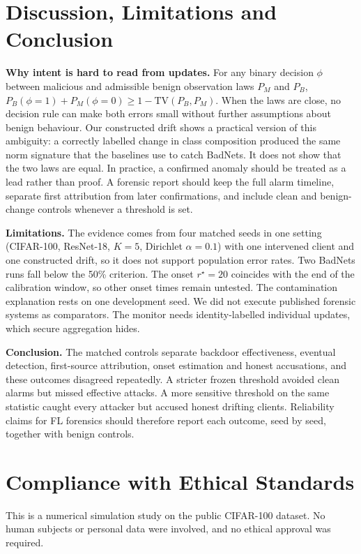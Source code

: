\documentclass{article}
\begin{document}
\section{Discussion, Limitations and Conclusion}
\label{sec:conclusion}

\textbf{Why intent is hard to read from updates.} For any binary decision $\phi$ between malicious and admissible
benign observation laws $P_M$ and $P_B$, $P_B(\phi=1)+P_M(\phi=0)\ge 1-\mathrm{TV}(P_B,P_M)$. When the laws are
close, no decision rule can make both errors small without further assumptions about benign behaviour. Our
constructed drift shows a practical version of this ambiguity: a correctly labelled change in class composition
produced the same norm signature that the baselines use to catch BadNets. It does not show that the two laws are
equal. In practice, a confirmed anomaly should be treated as a lead rather than proof. A forensic report should keep
the full alarm timeline, separate first attribution from later confirmations, and include clean and benign-change
controls whenever a threshold is set.

\textbf{Limitations.} The evidence comes from four matched seeds in one setting (CIFAR-100, ResNet-18, $K=5$,
Dirichlet $\alpha=0.1$) with one intervened client and one constructed drift, so it does not support population
error rates. Two BadNets runs fall below the 50\% criterion. The onset $r^\star=20$ coincides with the end of the
calibration window, so other onset times remain untested. The contamination explanation rests on one development
seed. We did not execute published forensic systems as comparators. The monitor needs identity-labelled individual
updates, which secure aggregation hides.

\textbf{Conclusion.} The matched controls separate backdoor effectiveness, eventual detection, first-source
attribution, onset estimation and honest accusations, and these outcomes disagreed repeatedly. A stricter frozen
threshold avoided clean alarms but missed effective attacks. A more sensitive threshold on the same statistic caught
every attacker but accused honest drifting clients. Reliability claims for FL forensics should therefore report
each outcome, seed by seed, together with benign controls.

\section{Compliance with Ethical Standards}
This is a numerical simulation study on the public CIFAR-100 dataset. No human subjects or personal data were
involved, and no ethical approval was required.
\end{document}
